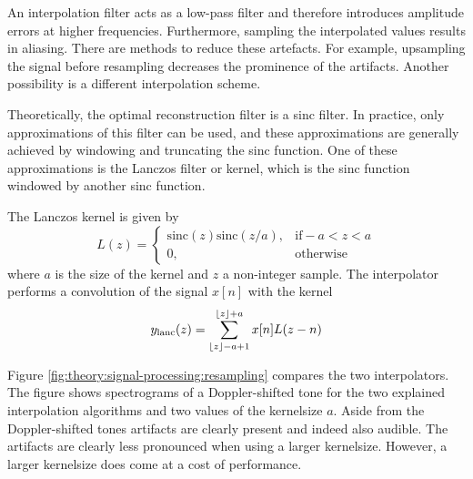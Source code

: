 An interpolation filter acts as a low-pass filter and therefore introduces
amplitude errors at higher frequencies. Furthermore, sampling the interpolated
values results in aliasing. There are methods to reduce these artefacts. For
example, upsampling the signal before resampling decreases the prominence of the
artifacts. Another possibility is a different interpolation scheme.

Theoretically, the optimal reconstruction filter is a sinc filter. In practice,
only approximations of this filter can be used, and these approximations are
generally achieved by windowing and truncating the sinc function. One of these
approximations is the Lanczos filter or kernel, which is the sinc function
windowed by another sinc function.

The Lanczos kernel is given by
\begin{equation}
 L(z) = \begin{cases}
         \textrm{sinc}(z) \textrm{sinc}(z/a), & \textrm{if} -a < z < a \\
         0, & \text{otherwise}
        \end{cases}
\end{equation}
where $a$ is the size of the kernel and $z$ a non-integer sample.
The interpolator performs a convolution of the signal $x[n]$ with the kernel
\begin{equation}
 y_{\mathrm{lanc}}(z) = \sum_{\lfloor z\rfloor - a + 1}^{\lfloor z\rfloor + a} x[n] L(z-n)
\end{equation}

Figure \ref{fig:theory:signal-processing:resampling} compares the two
interpolators. The figure shows spectrograms of a Doppler-shifted tone for the
two explained interpolation algorithms and two values of the kernelsize $a$.
Aside from the Doppler-shifted tones artifacts are clearly present and indeed
also audible. The artifacts are clearly less pronounced when using a larger
kernelsize. However, a larger kernelsize does come at a cost of performance.



%


